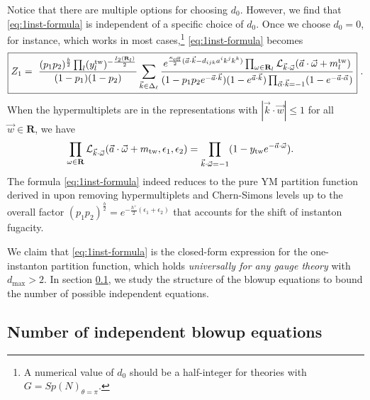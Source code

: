 \documentclass[letterpaper, 11pt]{article}
\def\CL{{\cal L}}
\def\e{\epsilon}
\def\w{\omega}
\begin{document}
Notice that there are multiple options for choosing $d_0$. However, we find that \eqref{eq:1inst-formula} is independent of a specific choice of $d_0$. Once we choose $d_0 = 0$, for instance, which works in most cases,\footnote{A numerical value of $d_0$ should be a half-integer for theories with $G = Sp(N)_{\theta=\pi}$.} \eqref{eq:1inst-formula} becomes
\begin{align}
\boxed{
  Z_1=\ \frac{(p_1p_2)^{\frac{b}{2}}\prod_{l}(y_{l}^{\text{tw}})^{-\frac{I_2(\mathbf{R}_l)}{2}}}{(1-p_1)(1-p_2)} \sum_{\vec{k}\in\Delta_\ell}\frac{e^{\frac{\kappa_{\text{eff}}}{2}(\vec{a}\cdot\vec{k}-d_{ijk}a^ik^jk^k)}\prod_{\w \in \mathbf{R}_l} \CL_{\vec{k}\cdot\vec{\w}}(\vec{a}\cdot \vec{\w} + m_{l}^\text{tw})}{(1-p_1p_2e^{-\vec{a}\cdot\vec{k}})(1-e^{\vec{a}\cdot\vec{k}})\prod_{\vec{\alpha}\cdot \vec{k}=-1}(1-e^{-\vec{a}\cdot\vec{\alpha}})}}\ .
\end{align} 
When the hypermultiplets are in the representations with $|\vec{k} \cdot \vec{w}|\le 1$ for all $\vec{w} \in \mathbf{R}$, we have
\begin{align}
  \label{eq:weight-expansion-non-sym}
  \prod_{\w \in \mathbf{R}} \CL_{\vec{k}\cdot\vec{\w}}(\vec{a}\cdot \vec{\w} + m_{\text{tw}}, \e_1,\e_2)  &=  \prod_{\vec{k}\cdot \vec{\w} = -1}(1-y_\text{tw} e^{-\vec{a}\cdot \vec{\w}}) .
\end{align}
The formula \eqref{eq:1inst-formula} indeed reduces to the pure YM partition function derived in \cite{Keller:2011ek, Keller:2012da} upon removing hypermultiplets and Chern-Simons levels up to the overall factor $(p_1 p_2)^{\frac{b}{2}} = e^{-\frac{h^\vee}{2} (\e_1 + \e_2)}$ that accounts for the shift of instanton fugacity. 

We claim that \eqref{eq:1inst-formula} is the closed-form expression for the one-instanton partition function, which holds \emph{universally for any gauge theory} with $d_{\text{max}}>2$.  
In section \ref{subsec:numd}, we study the structure of the blowup equations to bound the number of possible independent equations.  


\subsection{Number of independent blowup equations} \label{subsec:numd}
\end{document}
